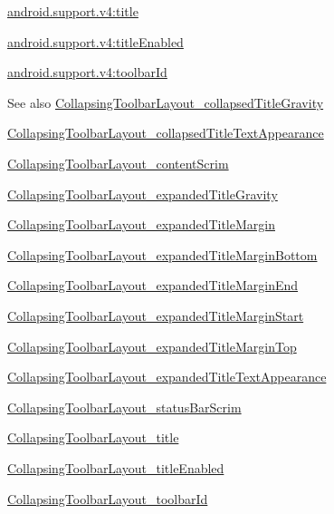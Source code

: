 {\ttfamily \hyperlink{classandroid_1_1support_1_1v4_1_1R_1_1styleable_aa433ebbb56ee0a51b7f7e167863bdd12}{android.\+support.\+v4\+:title}}

{\ttfamily \hyperlink{classandroid_1_1support_1_1v4_1_1R_1_1styleable_ac4319599b3c76f2446ebe9536abeba56}{android.\+support.\+v4\+:title\+Enabled}}

{\ttfamily \hyperlink{classandroid_1_1support_1_1v4_1_1R_1_1styleable_ab80f4b8280bdc2b619f7f20012eb6f41}{android.\+support.\+v4\+:toolbar\+Id}}

\begin{DoxySeeAlso}{See also}
\hyperlink{classandroid_1_1support_1_1v4_1_1R_1_1styleable_a116fc8e3a3a97d7ee07ca793adfc6443}{Collapsing\+Toolbar\+Layout\+\_\+collapsed\+Title\+Gravity} 

\hyperlink{classandroid_1_1support_1_1v4_1_1R_1_1styleable_a297bf6b40c1f2eee45e130be12d85e50}{Collapsing\+Toolbar\+Layout\+\_\+collapsed\+Title\+Text\+Appearance} 

\hyperlink{classandroid_1_1support_1_1v4_1_1R_1_1styleable_aee1e1a60d8efff968f52ae63c1b6859c}{Collapsing\+Toolbar\+Layout\+\_\+content\+Scrim} 

\hyperlink{classandroid_1_1support_1_1v4_1_1R_1_1styleable_aa59a6ab621e7092c65425b2e443edc19}{Collapsing\+Toolbar\+Layout\+\_\+expanded\+Title\+Gravity} 

\hyperlink{classandroid_1_1support_1_1v4_1_1R_1_1styleable_a6fd0a1e2b2413e90f19c65f14b587b87}{Collapsing\+Toolbar\+Layout\+\_\+expanded\+Title\+Margin} 

\hyperlink{classandroid_1_1support_1_1v4_1_1R_1_1styleable_af294e92101d0832bed66945ee1c5f89b}{Collapsing\+Toolbar\+Layout\+\_\+expanded\+Title\+Margin\+Bottom} 

\hyperlink{classandroid_1_1support_1_1v4_1_1R_1_1styleable_ad97c2223a320934180256ace4b0d2a40}{Collapsing\+Toolbar\+Layout\+\_\+expanded\+Title\+Margin\+End} 

\hyperlink{classandroid_1_1support_1_1v4_1_1R_1_1styleable_a5f942ec17cd01a93f6b3ce569421954b}{Collapsing\+Toolbar\+Layout\+\_\+expanded\+Title\+Margin\+Start} 

\hyperlink{classandroid_1_1support_1_1v4_1_1R_1_1styleable_a9e49bb8ccfb4c8294690cba1fce71f73}{Collapsing\+Toolbar\+Layout\+\_\+expanded\+Title\+Margin\+Top} 

\hyperlink{classandroid_1_1support_1_1v4_1_1R_1_1styleable_ad9258f77de37879142ccb6e7d0c1c841}{Collapsing\+Toolbar\+Layout\+\_\+expanded\+Title\+Text\+Appearance} 

\hyperlink{classandroid_1_1support_1_1v4_1_1R_1_1styleable_a0d19b1379e73d24050b61fe835c56593}{Collapsing\+Toolbar\+Layout\+\_\+status\+Bar\+Scrim} 

\hyperlink{classandroid_1_1support_1_1v4_1_1R_1_1styleable_aa433ebbb56ee0a51b7f7e167863bdd12}{Collapsing\+Toolbar\+Layout\+\_\+title} 

\hyperlink{classandroid_1_1support_1_1v4_1_1R_1_1styleable_ac4319599b3c76f2446ebe9536abeba56}{Collapsing\+Toolbar\+Layout\+\_\+title\+Enabled} 

\hyperlink{classandroid_1_1support_1_1v4_1_1R_1_1styleable_ab80f4b8280bdc2b619f7f20012eb6f41}{Collapsing\+Toolbar\+Layout\+\_\+toolbar\+Id} 
\end{DoxySeeAlso}
